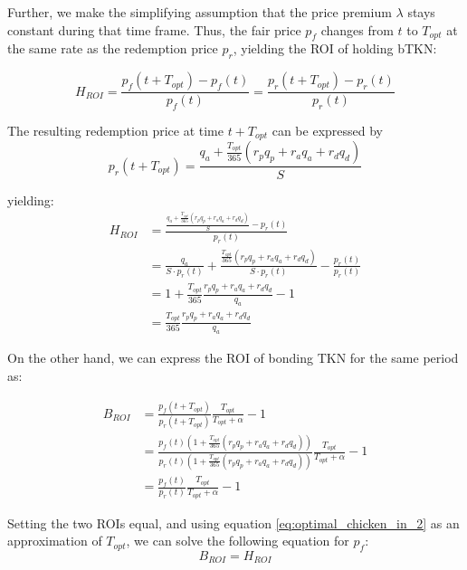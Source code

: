 \documentclass{article}
\begin{document}
Further, we make the simplifying assumption that the price premium $\lambda$ stays constant during that time frame. Thus, the fair price $p_f$ changes from $t$ to $T_{opt}$ at the same rate as the redemption price $p_r$, yielding the ROI of holding bTKN:

\begin{equation}
  \label{eq:ROI-eq}
  H_{ROI} = \frac{p_f(t + T_{opt}) - p_f(t)}{p_f(t)} = \frac{p_r(t + T_{opt}) - p_r(t)}{p_r(t)}
\end{equation}

The resulting redemption price at time $t + T_{opt}$ can be expressed by
\begin{equation}
  \label{eq:redemption-price}
    p_r(t + T_{opt}) = \frac{q_a + \frac{T_{opt}}{365} (r_p q_p + r_a q_a + r_d q_d)}{S}
\end{equation}

yielding:
\begin{equation}
  \label{eq:ROI-eq2}
  \begin{split}
    H_{ROI} & = \frac{\frac{q_a + \frac{T_{opt}}{365} (r_p q_p + r_a q_a + r_d q_d)}{S} - p_r(t)}{p_r(t)} \\
    & = \frac{q_a}{S \cdot p_r(t)} + \frac{\frac{T_{opt}}{365} (r_p q_p + r_a q_a + r_d q_d)}{S\cdot p_r(t)} - \frac{p_r(t)}{p_r(t)} \\
    & = 1 + \frac{T_{opt}}{365} \frac{r_p q_p + r_a q_a + r_d q_d}{q_a} - 1 \\
    & = \frac{T_{opt}}{365} \frac{r_p q_p + r_a q_a + r_d q_d}{q_a}
  \end{split}
\end{equation}

On the other hand, we can express the ROI of bonding TKN for the same period as:

\begin{equation}
  \label{eq:ROI-bonding}
  \begin{split}
    B_{ROI} & = \frac{p_f(t+T_{opt})}{p_r(t+T_{opt})}\frac{T_{opt}}{T_{opt}+\alpha} - 1 \\
    & = \frac{p_f(t)(1 + \frac{T_{opt}}{365} (r_p q_p + r_a q_a + r_d q_d))} {p_r(t)(1 + \frac{T_{opt}}{365} (r_p q_p + r_a q_a + r_d q_d))}    \frac{T_{opt}}{T_{opt}+\alpha} - 1 \\ 
    & = \frac{p_f(t)}{p_r(t)}\frac{T_{opt}}{T_{opt}+\alpha} - 1
  \end{split}
\end{equation}

Setting the two ROIs equal, and using equation \ref{eq:optimal_chicken_in_2} as an approximation of $T_{opt}$, we can solve the following equation for $p_f$:
\begin{equation}
  \label{eq:ROI-bonding-holding}
  B_{ROI} = H_{ROI}
\end{equation}
\end{document}
